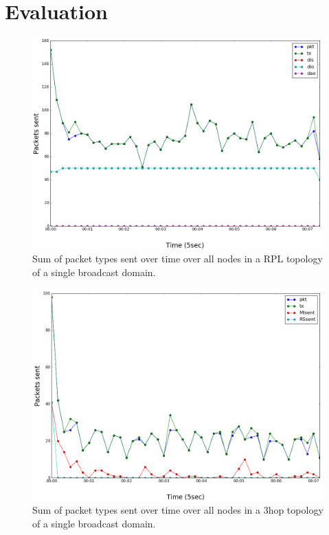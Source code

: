 \section{Evaluation} \label{section:evaluation}


\begin{figure}[t]
\centering
\includegraphics[width=\linewidth]{figs/rpl_single_hop.png}
\caption{Sum of packet types sent over time over all nodes in a RPL topology of a single broadcast domain.}
\label{fig:rpl_single_hop}
\end{figure}

\begin{figure}[t]
\centering
\includegraphics[width=\linewidth]{figs/3hop_single_hop.png}
\caption{Sum of packet types sent over time over all nodes in a 3hop topology of a single broadcast domain.}
\label{fig:3hop_single_hop}
\end{figure}

